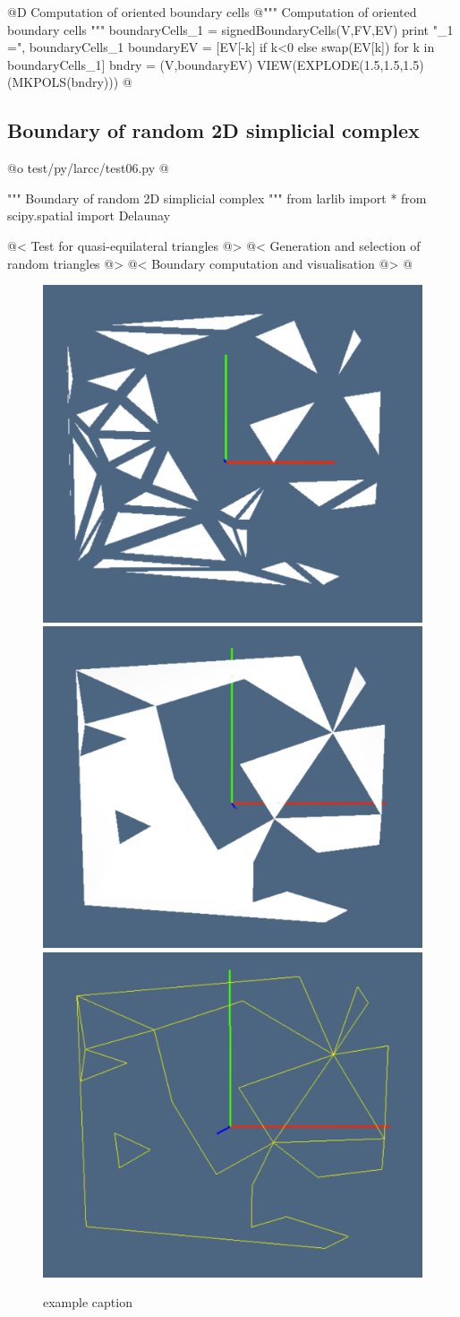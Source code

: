 \documentclass[11pt,oneside]{article}    %
\begin{document}
@D Computation of oriented boundary cells 
@{"""  Computation of oriented boundary cells """
boundaryCells_1 = signedBoundaryCells(V,FV,EV)
print "\nboundaryCells_1 =\n", boundaryCells_1
boundaryEV = [EV[-k] if k<0 else swap(EV[k]) for k in boundaryCells_1]
bndry = (V,boundaryEV)
VIEW(EXPLODE(1.5,1.5,1.5)(MKPOLS(bndry)))
@}

\subsection{Boundary of random 2D simplicial complex}

@o test/py/larcc/test06.py
@{""" Boundary of random 2D simplicial complex """
from larlib import *
from scipy.spatial import Delaunay

@< Test for quasi-equilateral triangles @>
@< Generation and selection of random triangles @>
@< Boundary computation and visualisation @>
@}


\begin{figure}[htbp] %
   \centering
   \includegraphics[height=0.25\linewidth,width=0.32\linewidth]{images/tria0} 
   \includegraphics[height=0.25\linewidth,width=0.32\linewidth]{images/tria1} 
   \includegraphics[height=0.25\linewidth,width=0.32\linewidth]{images/tria2} 
   \caption{example caption}
   \label{fig:example}
\end{figure}
\end{document}
